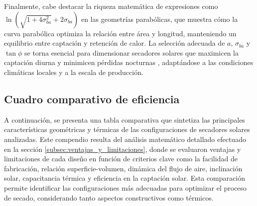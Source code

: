 \documentclass[12pt]{article}
\begin{document}
Finalmente, cabe destacar la riqueza matemática de expresiones como $\ln(\sqrt{1+4\sigma_{ba}^2}+2\sigma_{ba})$ en las geometrías parabólicas, que muestra cómo la curva parabólica optimiza la relación entre área y longitud, manteniendo un equilibrio entre captación y retención de calor. La selección adecuada de $a$, $\sigma_{ba}$ y $\tan\phi$ se torna esencial para dimensionar secadores solares que maximicen la captación diurna y minimicen pérdidas nocturnas \cite{belessiotis2011solar}\cite{mustayen2014performance}, adaptándose a las condiciones climáticas locales y a la escala de producción.

\clearpage

\subsection{Cuadro comparativo de eficiencia}

A continuación, se presenta una tabla comparativa que sintetiza las principales características geométricas y térmicas de las configuraciones de secadores solares analizadas. Este compendio resulta del análisis matemático detallado efectuado en la sección \ref{subsec:ventajas_y_limitaciones}, donde se evaluaron ventajas y limitaciones de cada diseño en función de criterios clave como la facilidad de fabricación, relación superficie-volumen, dinámica del flujo de aire, inclinación solar, capacitancia térmica y eficiencia en la captación solar. Esta comparación permite identificar las configuraciones más adecuadas para optimizar el proceso de secado, considerando tanto aspectos constructivos como térmicos.

\renewcommand{\arraystretch}{1.2}
\setlength{\tabcolsep}{6pt}
\end{document}

